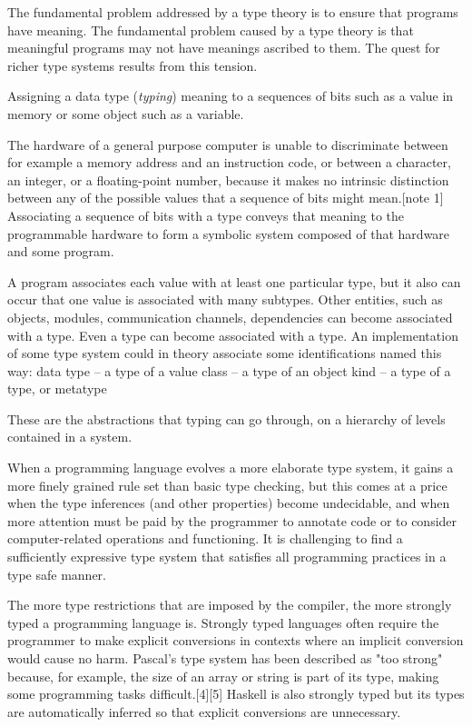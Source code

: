 \documentclass[12pt,b5paper]{book}
\theoremstyle{definition}
\begin{document}
The fundamental problem addressed by a type theory is to ensure that programs have meaning. The fundamental problem caused by a type theory is that meaningful programs may not have meanings ascribed to them. The quest for richer type systems results from this tension.

Assigning a data type (\textit{typing}) meaning to a sequences of bits such as a value in memory or some object such as a variable. 

The hardware of a general purpose computer is unable to discriminate between for example a memory address and an instruction code, or between a character, an integer, or a floating-point number, because it makes no intrinsic distinction between any of the possible values that a sequence of bits might mean.[note 1] Associating a sequence of bits with a type conveys that meaning to the programmable hardware to form a symbolic system composed of that hardware and some program.

A program associates each value with at least one particular type, but it also can occur that one value is associated with many subtypes. Other entities, such as objects, modules, communication channels, dependencies can become associated with a type. Even a type can become associated with a type. An implementation of some type system could in theory associate some identifications named this way:
data type – a type of a value
class – a type of an object
kind – a type of a type, or metatype

These are the abstractions that typing can go through, on a hierarchy of levels contained in a system.

When a programming language evolves a more elaborate type system, it gains a more finely grained rule set than basic type checking, but this comes at a price when the type inferences (and other properties) become undecidable, and when more attention must be paid by the programmer to annotate code or to consider computer-related operations and functioning. It is challenging to find a sufficiently expressive type system that satisfies all programming practices in a type safe manner.

The more type restrictions that are imposed by the compiler, the more strongly typed a programming language is. Strongly typed languages often require the programmer to make explicit conversions in contexts where an implicit conversion would cause no harm. Pascal's type system has been described as "too strong" because, for example, the size of an array or string is part of its type, making some programming tasks difficult.[4][5] Haskell is also strongly typed but its types are automatically inferred so that explicit conversions are unnecessary.
\end{document}
